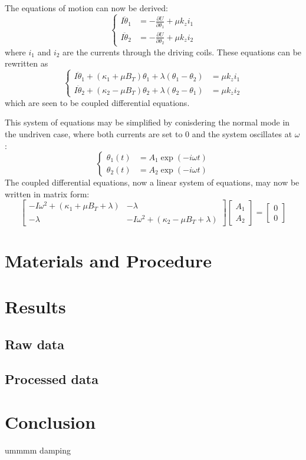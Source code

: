 \documentclass{article}
\begin{document}
The equations of motion can now be derived:
\begin{equation*}
    \begin{cases}
        I\ddot{\theta}_1 &= -\frac{\partial U}{\partial \theta_1} + \mu k_z i_1 \\
        I\ddot{\theta}_2 &= -\frac{\partial U}{\partial \theta_2} + \mu k_z i_2
    \end{cases}
\end{equation*}
where $i_1$ and $i_2$ are the currents through the driving coils. These equations can be rewritten as
\begin{equation*}
    \begin{cases}
        I\ddot{\theta}_1 + (\kappa_1 + \mu B_T)\theta_1 + \lambda(\theta_1 - \theta_2) &= \mu k_z i_1\\
        I\ddot{\theta}_2 + (\kappa_2 - \mu B_T)\theta_2 + \lambda(\theta_2 - \theta_1) &= \mu k_z i_2
    \end{cases}
\end{equation*}
which are seen to be coupled differential equations.

This system of equations may be simplified by conisdering the normal mode in the undriven case, where both currents are set to 0 and the system oscillates at $\omega$:
\begin{equation*}
    \begin{cases}
        \theta_1(t) &= A_1 \exp(-i\omega t) \\
        \theta_2(t) &= A_2 \exp(-i\omega t)
    \end{cases}
\end{equation*}
The coupled differential equations, now a linear system of equations, may now be written in matrix form:
\begin{equation*}
    \left[ \begin{matrix}
        -I\omega^2+(\kappa_1 + \mu B_T + \lambda)   &   -\lambda \\
        -\lambda                                    &   -I\omega^2+(\kappa_2 - \mu B_T + \lambda)
    \end{matrix} \right]\left[ \begin{matrix} A_1 \\ A_2 \end{matrix} \right] = \left[ \begin{matrix} 0\\0 \end{matrix} \right]
\end{equation*}

\section{Materials and Procedure}


\section{Results}
\subsection{Raw data}
\subsection{Processed data}

\section{Conclusion}
ummmm damping
\end{document}
